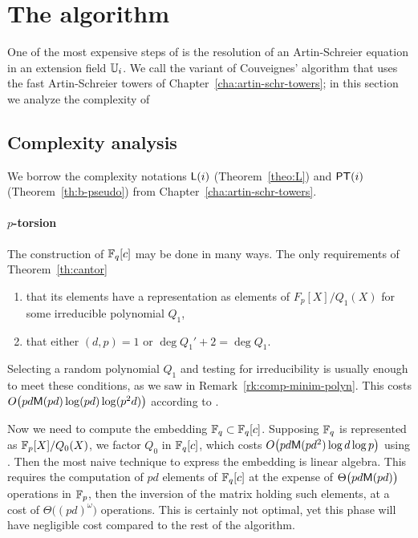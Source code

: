 \section{The algorithm }
\label{sec:C2-AS}

One of the most expensive steps of \ctwo{} is the resolution of an
Artin-Schreier equation in an extension field $\mathbb{U}_i$. We call \ctwoas{}
the variant of Couveignes' algorithm that uses the fast Artin-Schreier
towers of Chapter~\ref{cha:artin-schr-towers}; in this section we
analyze the complexity of \ctwoas{}

\subsection{Complexity analysis}
\label{sec:C2-AS:complexity}
We borrow the complexity notations $\mathsf{L}(i)$ (Theorem~\ref{theo:L})
and $\mathsf{PT}(i)$ (Theorem~\ref{th:b-pseudo}) from
Chapter~\ref{cha:artin-schr-towers}.

\paragraph{$p$-torsion}
The construction of $\mathbb{F}_q[c]$ may be done in many ways. The only
requirements of Theorem~\ref{th:cantor}
\begin{enumerate}
\item that its elements have a representation as elements of
  $F_p[X]/Q_1(X)$ for some irreducible polynomial $Q_1$,
\item that either $(d,p)=1$ or $\deg Q_1' + 2 = \deg Q_1$.
\end{enumerate}
Selecting a random polynomial $Q_1$ and testing for irreducibility is
usually enough to meet these conditions, as we saw in
Remark~\ref{rk:comp-minim-polyn}.  This costs $O\bigl(pd\mathsf{M}(pd)\log
(pd)\log(p^2d)\bigr)$ according to \cite[Th.  14.42]{vzGG}.

Now we need to compute the embedding $\mathbb{F}_q\subset\mathbb{F}_q[c]$. Supposing
$\mathbb{F}_q$ is represented as $\mathbb{F}_p[X]/Q_0(X)$, we factor $Q_0$ in
$\mathbb{F}_q[c]$, which costs $O\bigl(pd\mathsf{M}(pd^2)\log d\log p\bigr)$ using
\cite[Coro. 14.16]{vzGG}. Then the most naive technique to express the
embedding is linear algebra. This requires the computation of $pd$
elements of $\mathbb{F}_q[c]$ at the expense of $\Theta\bigl(pd\mathsf{M}(pd)\bigr)$
operations in $\mathbb{F}_p$, then the inversion of the matrix holding such
elements, at a cost of $\Theta\bigl((pd)^\omega\bigr)$ operations. This is
certainly not optimal, yet this phase will have negligible cost
compared to the rest of the algorithm.

